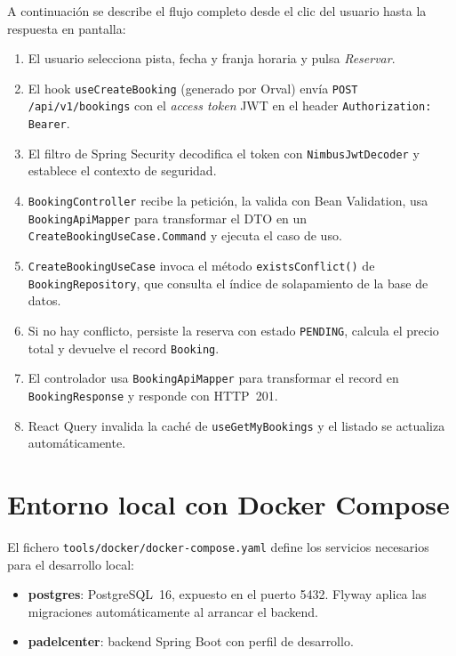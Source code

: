 A continuación se describe el flujo completo desde el clic del usuario hasta
la respuesta en pantalla:

\begin{sloppypar}
\begin{enumerate}
  \item El usuario selecciona pista, fecha y franja horaria y pulsa
    \textit{Reservar}.
  \item El hook \texttt{useCreateBooking} (generado por Orval) envía
    \texttt{POST /api/v1/bookings} con el \textit{access token} JWT en el
    header \texttt{Authorization: Bearer}.
  \item El filtro de Spring Security decodifica el token con
    \texttt{NimbusJwtDecoder} y establece el contexto de seguridad.
  \item \texttt{BookingController} recibe la petición, la valida con Bean
    Validation, usa \texttt{BookingApiMapper} para transformar el DTO en un
    \texttt{CreateBookingUseCase.Command} y ejecuta el caso de uso.
  \item \texttt{CreateBookingUseCase} invoca el método
    \texttt{existsConflict()} de \texttt{BookingRepository}, que consulta el
    índice de solapamiento de la base de datos.
  \item Si no hay conflicto, persiste la reserva con estado \texttt{PENDING},
    calcula el precio total y devuelve el record \texttt{Booking}.
  \item El controlador usa \texttt{BookingApiMapper} para transformar el record
    en \texttt{BookingResponse} y responde con HTTP~201.
  \item React Query invalida la caché de \texttt{useGetMyBookings} y el listado
    se actualiza automáticamente.
\end{enumerate}
\end{sloppypar}

\section{Entorno local con Docker Compose}
\label{sec:entorno_local}

El fichero \texttt{tools/docker/docker-compose.yaml} define los servicios
necesarios para el desarrollo local:

\begin{itemize}
  \item \textbf{postgres}: PostgreSQL~16, expuesto en el puerto 5432. Flyway
    aplica las migraciones automáticamente al arrancar el backend.
  \item \textbf{padelcenter}: backend Spring Boot con perfil de desarrollo.
\end{itemize}

